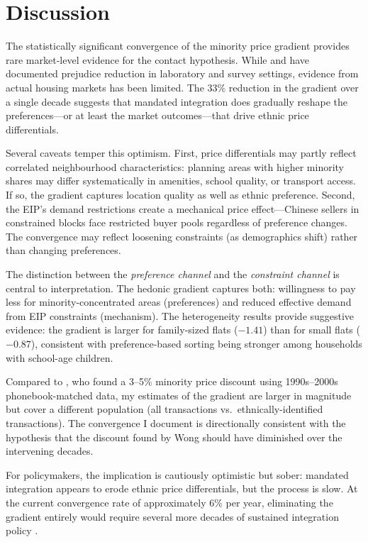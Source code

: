 \documentclass[12pt]{article}
\begin{document}



\section{Discussion}
\label{sec:discussion}

The statistically significant convergence of the minority price gradient provides rare market-level evidence for the contact hypothesis. While \citet{allport1954} and \citet{pettigrew2006} have documented prejudice reduction in laboratory and survey settings, evidence from actual housing markets has been limited. The 33\% reduction in the gradient over a single decade suggests that mandated integration does gradually reshape the preferences---or at least the market outcomes---that drive ethnic price differentials.

Several caveats temper this optimism. First, price differentials may partly reflect correlated neighbourhood characteristics: planning areas with higher minority shares may differ systematically in amenities, school quality, or transport access. If so, the gradient captures location quality as well as ethnic preference. Second, the EIP's demand restrictions create a mechanical price effect---Chinese sellers in constrained blocks face restricted buyer pools regardless of preference changes. The convergence may reflect loosening constraints (as demographics shift) rather than changing preferences.

The distinction between the \textit{preference channel} and the \textit{constraint channel} is central to interpretation. The hedonic gradient captures both: willingness to pay less for minority-concentrated areas (preferences) and reduced effective demand from EIP constraints (mechanism). The heterogeneity results provide suggestive evidence: the gradient is larger for family-sized flats ($-1.41$) than for small flats ($-0.87$), consistent with preference-based sorting being stronger among households with school-age children.

Compared to \citet{wong2013}, who found a 3--5\% minority price discount using 1990s--2000s phonebook-matched data, my estimates of the gradient are larger in magnitude but cover a different population (all transactions vs.\ ethnically-identified transactions). The convergence I document is directionally consistent with the hypothesis that the discount found by Wong should have diminished over the intervening decades.

For policymakers, the implication is cautiously optimistic but sober: mandated integration appears to erode ethnic price differentials, but the process is slow. At the current convergence rate of approximately 6\% per year, eliminating the gradient entirely would require several more decades of sustained integration policy \citep{paluck2019, ewens2014}.
\end{document}
